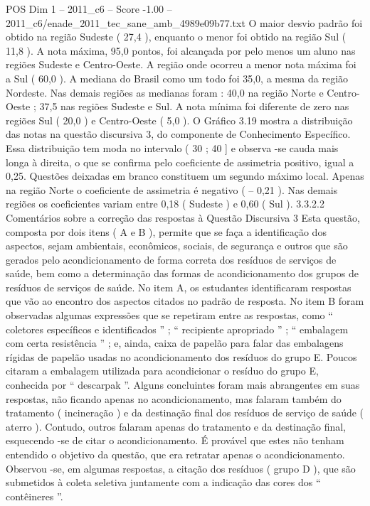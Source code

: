 \begin{textsample}{POS Dim 1 – 2011\_c6 – Score -1.00 – 2011\_c6/enade\_2011\_tec\_sane\_amb\_4989e09b77.txt}
O maior desvio padrão foi obtido na região Sudeste ( 27,4 ), enquanto o menor foi obtido na região Sul ( 11,8 ).
A nota máxima, 95,0 pontos, foi alcançada por pelo menos um aluno nas regiões Sudeste e Centro-Oeste.
A região onde ocorreu a menor nota máxima foi a Sul ( 60,0 ).
A mediana do Brasil como um todo foi 35,0, a mesma da região Nordeste.
Nas demais regiões as medianas foram : 40,0 na região Norte e Centro-Oeste ; 37,5 nas regiões Sudeste e Sul.
A nota mínima foi diferente de zero nas regiões Sul ( 20,0 ) e Centro-Oeste ( 5,0 ).
O Gráfico 3.19 mostra a distribuição das notas na questão discursiva 3, do componente de Conhecimento Específico.
Essa distribuição tem moda no intervalo ( 30 ; 40 ] e observa -se cauda mais longa à direita, o que se confirma pelo coeficiente de assimetria positivo, igual a 0,25.
Questões deixadas em branco constituem um segundo máximo local.
Apenas na região Norte o coeficiente de assimetria é negativo ( – 0,21 ).
Nas demais regiões os coeficientes variam entre 0,18 ( Sudeste ) e 0,60 ( Sul ). 3.3.2.2 Comentários sobre a correção das respostas à Questão Discursiva 3 Esta questão, composta por dois itens ( A e B ), permite que se faça a identificação dos aspectos, sejam ambientais, econômicos, sociais, de segurança e outros que são gerados pelo acondicionamento de forma correta dos resíduos de serviços de saúde, bem como a determinação das formas de acondicionamento dos grupos de resíduos de serviços de saúde.
No item A, os estudantes identificaram respostas que vão ao encontro dos aspectos citados no padrão de resposta.
No item B foram observadas algumas expressões que se repetiram entre as respostas, como “ coletores específicos e identificados ” ; “ recipiente apropriado ” ; “ embalagem com certa resistência ” ; e, ainda, caixa de papelão para falar das embalagens rígidas de papelão usadas no acondicionamento dos resíduos do grupo E.
Poucos citaram a embalagem utilizada para acondicionar o resíduo do grupo E, conhecida por “ descarpak ”.
Alguns concluintes foram mais abrangentes em suas respostas, não ficando apenas no acondicionamento, mas falaram também do tratamento ( incineração ) e da destinação final dos resíduos de serviço de saúde ( aterro ).
Contudo, outros falaram apenas do tratamento e da destinação final, esquecendo -se de citar o acondicionamento.
É provável que estes não tenham entendido o objetivo da questão, que era retratar apenas o acondicionamento.
Observou -se, em algumas respostas, a citação dos resíduos ( grupo D ), que são submetidos à coleta seletiva juntamente com a indicação das cores dos “ contêineres ”.

\end{textsample}
